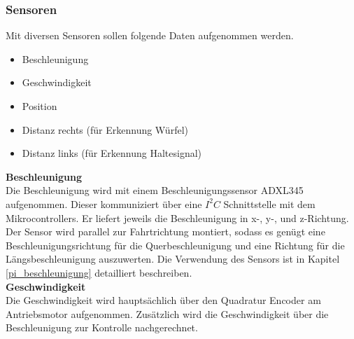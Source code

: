 \documentclass[../../main.tex]{subfiles}
\begin{document}
    \subsubsection{Sensoren} \label{et_sensoren}
    Mit diversen Sensoren sollen folgende Daten aufgenommen werden.
    \begin{itemize}
        \item Beschleunigung
        \item Geschwindigkeit
        \item Position
        \item Distanz rechts (für Erkennung Würfel)
        \item Distanz links (für Erkennung Haltesignal)
    \end{itemize}
    \pagebreak
    \textbf{Beschleunigung}\\
    Die Beschleunigung wird mit einem Beschleunigungssensor ADXL345 aufgenommen. Dieser kommuniziert über eine $I^2C$ Schnittstelle mit dem Mikrocontrollers. Er liefert jeweils die Beschleunigung in x-, y-, und z-Richtung. Der Sensor wird parallel zur Fahrtrichtung montiert, sodass es genügt eine Beschleunigungsrichtung für die Querbeschleunigung und eine Richtung für die Längsbeschleunigung auszuwerten. Die Verwendung des Sensors ist in Kapitel \ref{pi_beschleunigung} detailliert beschreiben.\\

    \textbf{Geschwindigkeit}\\
    Die Geschwindigkeit wird hauptsächlich über den Quadratur Encoder am Antriebsmotor aufgenommen. Zusätzlich wird die
    Geschwindigkeit über die Beschleunigung zur Kontrolle nachgerechnet.
\end{document}

